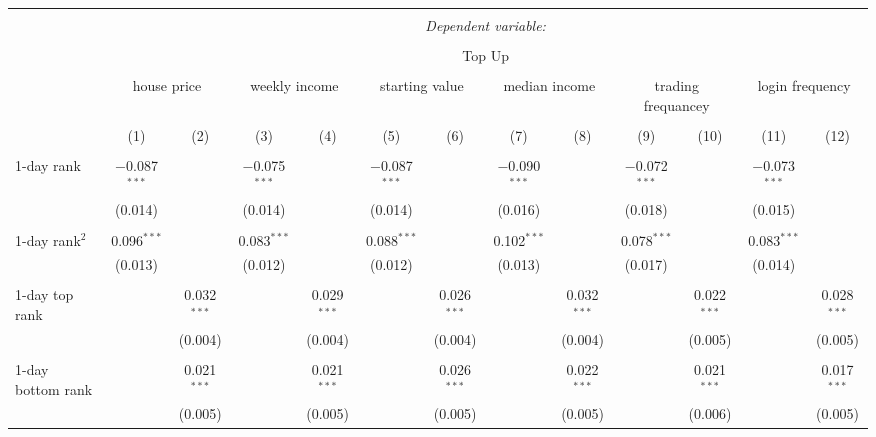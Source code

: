




\begin{tabular}{@{\extracolsep{2pt}}lcccccccccccc} 
		\\[-1.8ex]\hline 
\hline \\[-1.8ex] 
& \multicolumn{12}{c}{\textit{Dependent variable:}} \\ 
\cline{2-13} 
\\[-1.8ex] & \multicolumn{12}{c}{Top Up} \\ 
\\[-1.8ex] & \multicolumn{2}{c}{house price}& \multicolumn{2}{c}{weekly income}& \multicolumn{2}{c}{starting value}& \multicolumn{2}{c}{median income}& \multicolumn{2}{c}{trading frequancey} & \multicolumn{2}{c}{login frequency}\\
\cmidrule(lr){2-3}
\cmidrule(lr){4-5}
\cmidrule(lr){6-7}
\cmidrule(lr){8-9}
\cmidrule(lr){10-11}
\cmidrule(lr){12-13}
\\[-1.8ex] & (1) & (2) & (3) & (4)& (5) & (6) & (7) & (8)& (9) & (10) & (11) & (12)\\ 
\hline \\[-1.8ex] 
1-day rank & $-$0.087$^{***}$ &  & $-$0.075$^{***}$ &  & $-$0.087$^{***}$ &  & $-$0.090$^{***}$ &  & $-$0.072$^{***}$ &  & $-$0.073$^{***}$ &  \\ 
& (0.014) &  & (0.014) &  & (0.014) &  & (0.016) &  & (0.018) &  & (0.015) &  \\ 
& & & & & & & & & & & & \\ 
1-day rank$^2$ & 0.096$^{***}$ &  & 0.083$^{***}$ &  & 0.088$^{***}$ &  & 0.102$^{***}$ &  & 0.078$^{***}$ &  & 0.083$^{***}$ &  \\ 
& (0.013) &  & (0.012) &  & (0.012) &  & (0.013) &  & (0.017) &  & (0.014) &  \\ 
& & & & & & & & & & & & \\ 
1-day top rank &  & 0.032$^{***}$ &  & 0.029$^{***}$ &  & 0.026$^{***}$ &  & 0.032$^{***}$ &  & 0.022$^{***}$ &  & 0.028$^{***}$ \\ 
&  & (0.004) &  & (0.004) &  & (0.004) &  & (0.004) &  & (0.005) &  & (0.005) \\ 
& & & & & & & & & & & & \\ 
1-day bottom rank &  & 0.021$^{***}$ &  & 0.021$^{***}$ &  & 0.026$^{***}$ &  & 0.022$^{***}$ &  & 0.021$^{***}$ &  & 0.017$^{***}$ \\ 
&  & (0.005) &  & (0.005) &  & (0.005) &  & (0.005) &  & (0.006) &  & (0.005) \\ 

\end{tabular}
